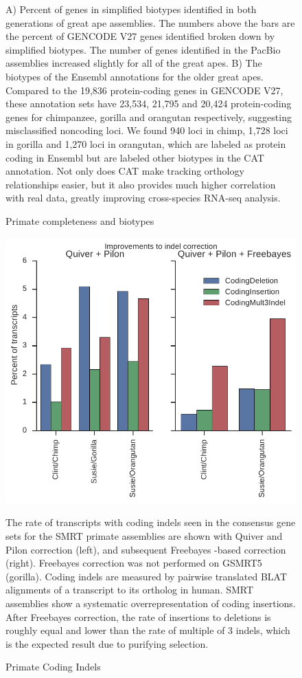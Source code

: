 \documentclass[fleqn,10pt]{wlscirep}
\begin{document}
\begin{figure}
\caption{Primate completeness and biotypes}
A) Percent of genes in simplified biotypes identified in both generations of great ape assemblies. The numbers above the bars are the percent of GENCODE V27 genes identified broken down by simplified biotypes. The number of genes identified in the PacBio assemblies increased slightly for all of the great apes. B) The biotypes of the Ensembl annotations for the older great apes. Compared to the 19,836 protein-coding genes in GENCODE V27, these annotation sets have 23,534, 21,795 and 20,424 protein-coding genes for chimpanzee, gorilla and orangutan respectively, suggesting misclassified noncoding loci. We found 940 loci in chimp, 1,728 loci in gorilla and 1,270 loci in orangutan, which are labeled as protein coding in Ensembl but are labeled other biotypes in the CAT annotation. Not only does CAT make tracking orthology relationships easier, but it also provides much higher correlation with real data, greatly improving cross-species RNA-seq analysis.
\label{supp_fig:primate_completeness}
\end{figure}

\begin{figure}
\centering
\includegraphics[width=\textwidth,height=\textheight,keepaspectratio]{primate_indels.pdf}
\caption{Primate Coding Indels}
The rate of transcripts with coding indels seen in the consensus gene sets for the SMRT primate assemblies are shown with Quiver and Pilon correction (left), and subsequent Freebayes \cite{garrison2012haplotype}-based correction (right). Freebayes correction was not performed on GSMRT5 (gorilla). Coding indels are measured by pairwise translated BLAT alignments of a transcript to its ortholog in human. SMRT assemblies show a systematic overrepresentation of coding insertions. After Freebayes correction, the rate of insertions to deletions is roughly equal and lower than the rate of multiple of 3 indels, which is the expected result due to purifying selection.
\label{supp_fig:primate_indels}
\end{figure}
\end{document}
